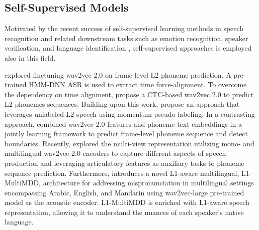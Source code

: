 \documentclass[11pt]{article}
\begin{document}
\subsection{Self-Supervised Models}

Motivated by the recent success of self-supervised learning methods \cite{baevski2020wav2vec, hsu2021hubert, chen2022wavlm, 9893562} in speech recognition and related downstream tasks such as emotion recognition, speaker verification, and language identification \cite{chen2023exploring, fan2020exploring}, self-supervised approaches is employed also in this field. 



\citet{xu2021explore} explored finetuning wav2vec 2.0 on frame-level L2 phoneme prediction. A pre-trained HMM-DNN ASR is used to extract time force-alignment. To overcome the dependency on time alignment, \citet{peng2021study} propose a CTC-based wav2vec 2.0 to predict L2 phonemes sequences. Building upon this work, \citet{yang2022improving} propose an approach that leverages unlabeled L2 speech using momentum pseudo-labeling. In a contrasting approach, \cite{9746727} combined wav2vec 2.0 features and phoneme text embeddings in a jointly learning framework to predict frame-level phoneme sequence and detect boundaries. Recently, \citet{kheir2023multi} explored the multi-view representation utilizing mono- and multilingual wav2vec 2.0 encoders to capture different aspects of speech production and leveraging articulatory features as auxiliary tasks to phoneme sequence prediction. Furthermore, \citet{kheir2023l1} introduces a novel L1-aware multilingual, L1-MultiMDD, architecture for addressing mispronunciation in multilingual settings encompassing Arabic, English, and Mandarin using wav2vec-large pre-trained model as the acoustic encoder. L1-MultiMDD is enriched with L1-aware speech representation, allowing it to understand the nuances of each speaker's native language.

\end{document}
